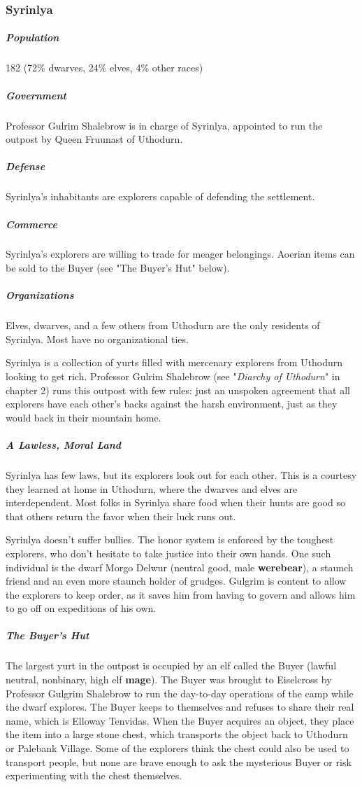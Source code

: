 \documentclass[10pt,a4paper,twoside,bg=print,twocolumn,openany,nodeprecatedcode]{dndbook}
\begin{document}
\subsubsection{Syrinlya}
\subparagraph{Population}
182 (72\% dwarves, 24\% elves, 4\% other races)

\subparagraph{Government}
Professor Gulrim Shalebrow is in charge of Syrinlya, appointed to run the outpost by Queen Fruunast of Uthodurn.

\subparagraph{Defense}
Syrinlya's inhabitants are explorers capable of defending the settlement.

\subparagraph{Commerce}
Syrinlya's explorers are willing to trade for meager belongings. Aoerian items can be sold to the Buyer (see "The Buyer's Hut" below).

\subparagraph{Organizations}
Elves, dwarves, and a few others from Uthodurn are the only residents of Syrinlya. Most have no organizational ties.

Syrinlya is a collection of yurts filled with mercenary explorers from Uthodurn looking to get rich. Professor Gulrim Shalebrow (see "\textit{Diarchy of Uthodurn}" in chapter 2) runs this outpost with few rules: just an unspoken agreement that all explorers have each other's backs against the harsh environment, just as they would back in their mountain home.

\subparagraph{A Lawless, Moral Land}
Syrinlya has few laws, but its explorers look out for each other. This is a courtesy they learned at home in Uthodurn, where the dwarves and elves are interdependent. Most folks in Syrinlya share food when their hunts are good so that others return the favor when their luck runs out.

Syrinlya doesn't suffer bullies. The honor system is enforced by the toughest explorers, who don't hesitate to take justice into their own hands. One such individual is the dwarf Morgo Delwur (neutral good, male \textbf{werebear}), a staunch friend and an even more staunch holder of grudges. Gulgrim is content to allow the explorers to keep order, as it saves him from having to govern and allows him to go off on expeditions of his own.

\subparagraph{The Buyer's Hut}
The largest yurt in the outpost is occupied by an elf called the Buyer (lawful neutral, nonbinary, high elf \textbf{mage}). The Buyer was brought to Eiselcross by Professor Gulgrim Shalebrow to run the day-to-day operations of the camp while the dwarf explores. The Buyer keeps to themselves and refuses to share their real name, which is Elloway Tenvidas. When the Buyer acquires an object, they place the item into a large stone chest, which transports the object back to Uthodurn or Palebank Village. Some of the explorers think the chest could also be used to transport people, but none are brave enough to ask the mysterious Buyer or risk experimenting with the chest themselves.
\end{document}
